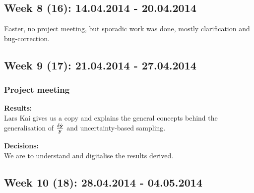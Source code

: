 






\subsection*{Week 8 (16): 14.04.2014 - 20.04.2014}
Easter, no project meeting, but sporadic work was done, mostly clarification and bug-correction.


\subsection*{Week 9 (17): 21.04.2014 - 27.04.2014}\subsubsection*{Project meeting}


\textbf{Results:}\\
Lars Kai gives us a copy and explains the general concepts behind the generalisation of $\frac{\delta \hat{{\bf y}}}{{\bf y}}$ and uncertainty-based sampling.

\textbf{Decisions:}\\
We are to understand and digitalise the results derived.




\subsection*{Week 10 (18): 28.04.2014 - 04.05.2014}
